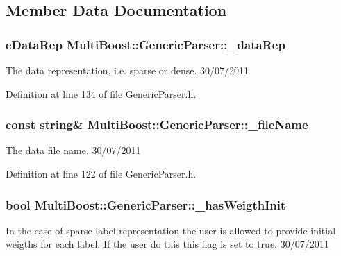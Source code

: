 \subsection{Member Data Documentation}
\hypertarget{classMultiBoost_1_1GenericParser_a37390f83bc3e4b3788d7f007aeb92389}{
\subsubsection[{\-\_\-data\-Rep}]{\setlength{\rightskip}{0pt plus 5cm}e\-Data\-Rep Multi\-Boost\-::\-Generic\-Parser\-::\-\_\-data\-Rep\hspace{0.3cm}{\ttfamily [protected]}}}\label{classMultiBoost_1_1GenericParser_a37390f83bc3e4b3788d7f007aeb92389}
The data representation, i.\-e. sparse or dense.  30/07/2011 

Definition at line 134 of file Generic\-Parser.\-h.

\hypertarget{classMultiBoost_1_1GenericParser_a56736441432a14e17a81e19b4707e672}{
\subsubsection[{\-\_\-file\-Name}]{\setlength{\rightskip}{0pt plus 5cm}const string\& Multi\-Boost\-::\-Generic\-Parser\-::\-\_\-file\-Name\hspace{0.3cm}{\ttfamily [protected]}}}\label{classMultiBoost_1_1GenericParser_a56736441432a14e17a81e19b4707e672}
The data file name.  30/07/2011 

Definition at line 122 of file Generic\-Parser.\-h.

\hypertarget{classMultiBoost_1_1GenericParser_a2a3966c40707b69fde1dffc85a04a399}{
\subsubsection[{\-\_\-has\-Weigth\-Init}]{\setlength{\rightskip}{0pt plus 5cm}bool Multi\-Boost\-::\-Generic\-Parser\-::\-\_\-has\-Weigth\-Init\hspace{0.3cm}{\ttfamily [protected]}}}\label{classMultiBoost_1_1GenericParser_a2a3966c40707b69fde1dffc85a04a399}
In the case of sparse label representation the user is allowed to provide initial weigths for each label. If the user do this this flag is set to true.  30/07/2011 

